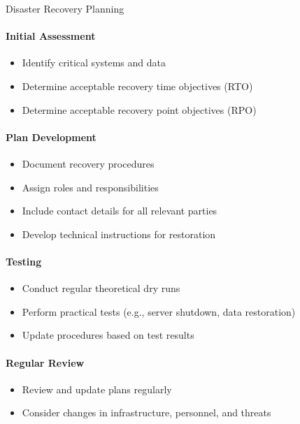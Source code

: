 \begin{KR}{Disaster Recovery Planning}\\
\paragraph{Initial Assessment}
\begin{itemize}
    \item Identify critical systems and data
    \item Determine acceptable recovery time objectives (RTO)
    \item Determine acceptable recovery point objectives (RPO)
\end{itemize}

\paragraph{Plan Development}
\begin{itemize}
    \item Document recovery procedures
    \item Assign roles and responsibilities
    \item Include contact details for all relevant parties
    \item Develop technical instructions for restoration
\end{itemize}

\paragraph{Testing}
\begin{itemize}
    \item Conduct regular theoretical dry runs
    \item Perform practical tests (e.g., server shutdown, data restoration)
    \item Update procedures based on test results
\end{itemize}

\paragraph{Regular Review}
\begin{itemize}
    \item Review and update plans regularly
    \item Consider changes in infrastructure, personnel, and threats
\end{itemize}
\end{KR}

